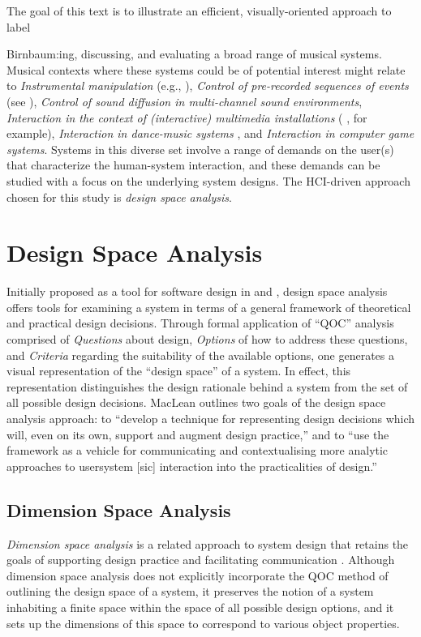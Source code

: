 The goal of this text is to illustrate an efficient, visually-oriented approach to label{Birnbaum:ing, discussing, and evaluating a broad range of musical systems. Musical contexts where these systems could be of potential interest might relate to \emph{Instrumental manipulation} (e.g., \cite{Waisvisz:1985}), \emph{Control of pre-recorded sequences of events} (see \cite{Mathews:1989,Boie:1989b}), \emph{Control of sound diffusion in multi-channel sound environments}, \emph{Interaction in the context of (interactive) multimedia installations} ( \cite{Winkler:2000}, for example), \emph{Interaction in dance-music systems} \cite{Camurri:1995}, and \emph{Interaction in computer game systems}. Systems in this diverse set involve a range of demands on the user(s) that characterize the human-system interaction, and these demands can be studied with a focus on the underlying system designs. The HCI-driven approach chosen for this study is \emph{design space analysis}.

\section{Design Space Analysis}

Initially proposed as a tool for software design in \cite{MacLean:1993} and \cite{MacLean:1995}, design space analysis offers tools for examining a system in terms of a general framework of theoretical and practical design decisions. Through formal application of ``QOC'' analysis comprised of \emph{Questions} about design, \emph{Options} of how to address these questions, and \emph{Criteria} regarding the suitability of the available options, one generates a visual representation of the ``design space'' of a system. In effect, this representation distinguishes the design rationale behind a system from the set of all possible design decisions. MacLean \cite{MacLean:1993} outlines two goals of the design space analysis approach: to ``develop a technique for representing design decisions which will, even on its own, support and augment design practice,'' and to ``use the framework as a vehicle for communicating and contextualising more analytic approaches to usersystem [sic] interaction into the practicalities of design.''

\subsection{Dimension Space Analysis}

\emph{Dimension space analysis} is a related approach to system design that retains the goals of supporting design practice and facilitating communication \cite{Graham:2000}. Although dimension space analysis does not explicitly incorporate the QOC method of outlining the design space of a system, it preserves the notion of a system inhabiting a finite space within the space of all possible design options, and it sets up the dimensions of this space to correspond to various object properties.

}
